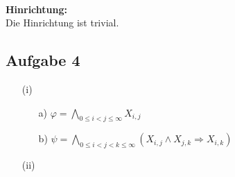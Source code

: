 \documentclass[a4paper,10pt]{article}
\begin{document}
	\ \\ \textbf{Hinrichtung:} \\
	Die Hinrichtung ist trivial.
	
	\subsection*{Aufgabe 4}
	\begin{enumerate}
	\item[(i)]
		\begin{enumerate}
		\item[a)]
		\(\varphi = \bigwedge\limits_{0 \leq i < j \leq \infty} X_{i,j} \)
						
		\item[b)]
		\( \psi = \bigwedge\limits_{0 \leq i < j < k \leq \infty}(X_{i,j} \wedge X_{j,k} \Rightarrow X_{i,k}) \)
		
		\end{enumerate}
	\item[(ii)]
	\end{enumerate}
\end{document}
